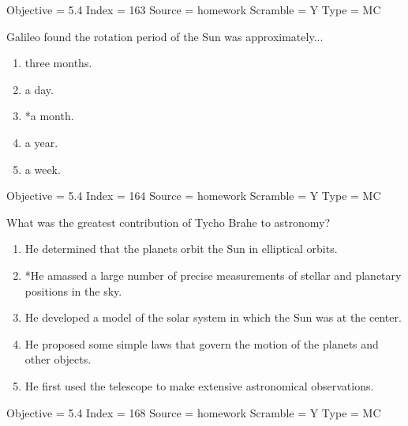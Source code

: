\documentclass[11pt]{article}
\begin{document}
\begin{enumerate}
\begin{minipage}{\textwidth}
\begin{minipage}{\textwidth}
Objective = 5.4
Index = 163
Source = homework
Scramble = Y
Type = MC
\end{minipage}
\end{minipage}
\vskip 0.20in

\begin{minipage}{\textwidth}
\begin{minipage}{\textwidth}
\item Galileo found the rotation period of the Sun was approximately...
\begin{multicols}{3}
\begin{enumerate} 
\setlength{\itemsep}{1pt} 
\setlength{\parskip}{0pt} 
\setlength{\parsep}{0pt}
\setlength{\multicolsep}{1pt} 
\item three months.
\item a day.
\item *a month.
\item a year.
\item a week.
\end{enumerate} 
\vfill 
\end{multicols}

Objective = 5.4
Index = 164
Source = homework
Scramble = Y
Type = MC
\end{minipage}
\end{minipage}
\vskip 0.20in

\begin{minipage}{\textwidth}
\begin{minipage}{\textwidth}
\item What was the greatest contribution of Tycho Brahe to astronomy?
\begin{enumerate} 
\setlength{\itemsep}{1pt} 
\setlength{\parskip}{0pt} 
\setlength{\parsep}{0pt}
\setlength{\multicolsep}{1pt} 
\item He determined that the planets orbit the Sun in elliptical orbits.
\item *He amassed a large number of precise measurements of stellar and planetary positions in the sky.
\item He developed a model of the solar system in which the Sun was at the center.
\item He proposed some simple laws that govern the motion of the planets and other objects.
\item He first used the telescope to make extensive astronomical observations.
\end{enumerate} 
Objective = 5.4
Index = 168
Source = homework
Scramble = Y
Type = MC
\end{minipage}
\end{minipage}
\vskip 0.20in


\end{enumerate}
\end{document}

